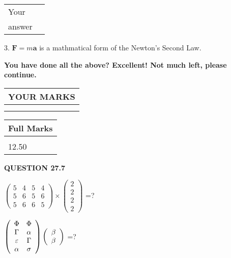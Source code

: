 \documentclass[12pt]{article}
\begin{document}
\noindent\begin{tabular}{|l|l|}\hline Your&\hspace{.2in} \\ answer&\hspace{.2in} \\ \hline \end{tabular}
3.  %
$\mathbf{F}=m\mathbf{a}$ is a mathmatical form of
the Newton's Second Law.
 

 
\vspace{0.3in}
   
   
\vspace{0.3in}
{\textbf{\LARGE{You have done all the above? Excellent! Not much left, please continue.}}}
\vspace{0.3in}
   
   
  
\vspace{0.2in}
  
\noindent\begin{tabular}{|l|}
\hline
 YOUR MARKS  \\
\hline
 \\ 
 \\ 
\hline
\end{tabular}
\hspace{0.05in} \begin{tabular}{|l|}
\hline
 Full Marks  \\
\hline
 \\ 
12.50 \\
\hline
\end{tabular}
{\textbf{\Large{QUESTION
27.7 
}}}
  
  
 
$ \left( \begin{array}{ccccccccc}
           5  & 
           4  & 
           5  & 
           4  \\ 
           5  & 
           6  & 
           5  & 
           6  \\ 
           5  & 
           6  & 
           6  & 
           5
\end{array}\right) \times
\left( \begin{array}{c}
           2  \\ 
           2  \\ 
           2  \\ 
           2
\end{array}\right) $ =?
 
 
$  %
 \left( \begin{array}
 {
 c
 c
 }
 \Phi & 
 \Phi \\ 
 \Gamma & 
 \alpha \\ 
 \varepsilon & 
 \Gamma \\ 
 \alpha & 
 \sigma
 \end{array} \right)
 \left( \begin{array}
 {
 c
 }
 \beta \\ 
 \beta
 \end{array} \right)
$ =?
 
\end{document}
